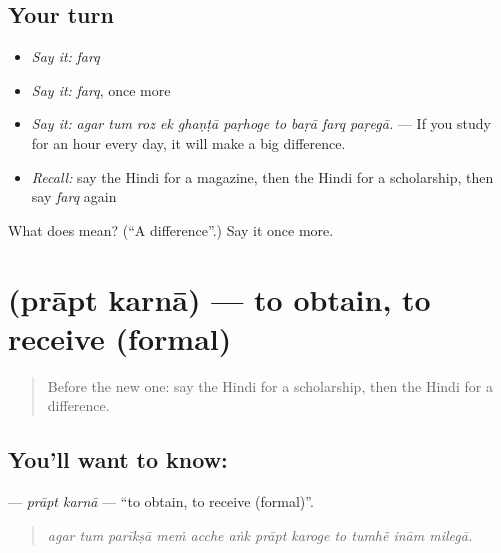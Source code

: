 \subsection*{Your turn}
\begin{itemize}
\raggedright
  \item \emph{Say it:} \emph{farq}
  \item \emph{Say it:} \emph{farq}, once more
  \item \emph{Say it:} \emph{agar tum roz ek ghaṇṭā paṛhoge to baṛā farq paṛegā.} — If you study for an hour every day, it will make a big difference.
  \item \emph{Recall:} say the Hindi for a magazine, then the Hindi for a scholarship, then say \emph{farq} again
\end{itemize}

\begin{tcolorbox}[breakable,colback=teal!4,colframe=teal!35!black,title={Before you move on}]
What does  mean? (\textquotedblleft{}A difference\textquotedblright{}.) Say it once more.
\end{tcolorbox}
\section[\texorpdfstring{\hi{प्राप्त} \hi{करना} (prāpt karnā)}{प्राप्त करना (prāpt karnā)}]{  (prāpt karnā) — to obtain, to receive (formal)}

\label{lesson:HI-C397-praptkarna}



\begin{quote}
Before the new one: say the Hindi for a scholarship, then the Hindi for a difference.
\end{quote}

\subsection*{You'll want to know:  }
\textbf{ } — \emph{prāpt karnā} — \textquotedblleft{}to obtain, to receive (formal)\textquotedblright{}.

\begin{quote}
           
\end{quote}

\begin{quote}
\emph{agar tum parīkṣā meṁ acche aṅk prāpt karoge to tumhẽ inām milegā.}
\end{quote}

